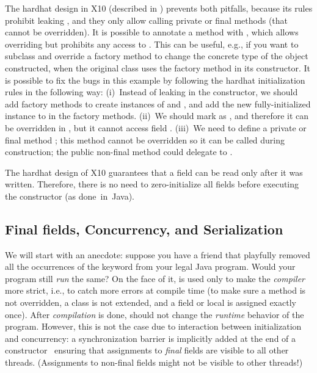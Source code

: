 The hardhat design in X10 (described in )
    prevents both pitfalls,
    because its rules prohibit leaking \this,
    and they only allow calling private or final methods (that cannot be overridden).
It is possible to annotate a method with ,
    which allows overriding but prohibits any access to \this.
This can be useful, e.g., if you want to subclass and override a factory method
    to change the concrete type of the object constructed,
    when the original class uses the factory method in its constructor.
It is possible to fix the bugs in this example by following the hardhat initialization rules
    in the following way:
    (i)~Instead of leaking \this in the constructor,
        we should add factory methods to create instances of  and ,
        and add the new fully-initialized instance to  in the factory methods.
    (ii)~We should mark  as ,
        and therefore it can be overridden in , but it cannot access field .
    (iii)~We need to define a private or final method ;
        this method cannot be overridden so it can be called during construction;
        the public non-final method  could delegate to .

The hardhat design of X10 guarantees that a field can be read only after it was written.
Therefore, there is no need to zero-initialize all fields before executing the constructor (as done~in~Java).


\subsection{Final fields, Concurrency, and Serialization}
\label{Section:FinalFields}
We will start with an anecdote:
    suppose you have a friend that
    playfully removed all the occurrences of the  keyword
    from your legal Java program.
Would your program still \emph{run} the same?
On the face of it,  is used only to make the \emph{compiler} more {strict},
    i.e., to catch more errors at compile time
    (to make sure a method is not overridden, a class is not extended, and a field or local
        is assigned exactly once).
After \emph{compilation} is done,  should not change the \emph{runtime} behavior of the program.
However, this is not the case due to interaction between initialization and concurrency:
    a synchronization barrier is implicitly added
    at the end of a constructor~\cite{JSR133}
    ensuring that assignments to \emph{final} fields are visible to all other threads.
(Assignments to non-final fields might not be visible to other threads!)

